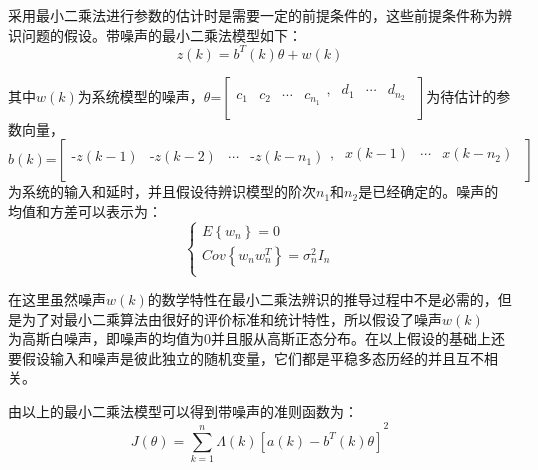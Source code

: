 采用最小二乘法进行参数的估计时是需要一定的前提条件的，这些前提条件称为辨识问题的假设。带噪声的最小二乘法模型如下：
\begin{equation}
z\left( k \right)={{b}^{T}}(k)\theta +w(k)
\end{equation}

其中$w(k)$为系统模型的噪声，$\theta \text{=}\left[ \begin{matrix}
   {{c}_{1}} & {{c}_{2}} & \cdots  & {{c}_{{{n}_{1}}}}\begin{matrix}
   , & {{d}_{1}} & \cdots  & {{d}_{{{n}_{2}}}}  \\
\end{matrix}  \\
\end{matrix} \right]$为待估计的参数向量，$b(k)\text{=}\left[ \begin{matrix}
   \text{-}z\left( k-1 \right) & \text{-}z\left( k-2 \right) & \cdots  & \text{-}z\left( k-{{n}_{1}} \right)\begin{matrix}
   , & x\left( k-1 \right) & \cdots  & x\left( k-{{n}_{2}} \right)  \\
\end{matrix}  \\
\end{matrix} \right]$\\为系统的输入和延时，并且假设待辨识模型的阶次${{n}_{1}}$和${{n}_{2}}$是已经确定的。噪声的均值和方差可以表示为：
\begin{equation}
\left\{  \begin{array}{l}
   E\left\{ {{w}_{n}} \right\}=0 \\ 
  Cov\left\{ {{w}_{n}}w_{n}^{T} \right\}=\sigma _{n}^{2}{{I}_{n}} \\ 
\end{array} \right.
\end{equation}

在这里虽然噪声$w(k)$的数学特性在最小二乘法辨识的推导过程中不是必需的，但是为了对最小二乘算法由很好的评价标准和统计特性，所以假设了噪声$w(k)$\\为高斯白噪声，即噪声的均值为0并且服从高斯正态分布。在以上假设的基础上还要假设输入和噪声是彼此独立的随机变量，它们都是平稳多态历经的并且互不相关。

由以上的最小二乘法模型可以得到带噪声的准则函数为：
\begin{equation}
J\left( \theta  \right)={{\sum\limits_{k=1}^{n}{\Lambda \left( k \right)\left[ a(k)-{{b}^{T}}(k)\theta  \right]}}^{2}}
\end{equation}

